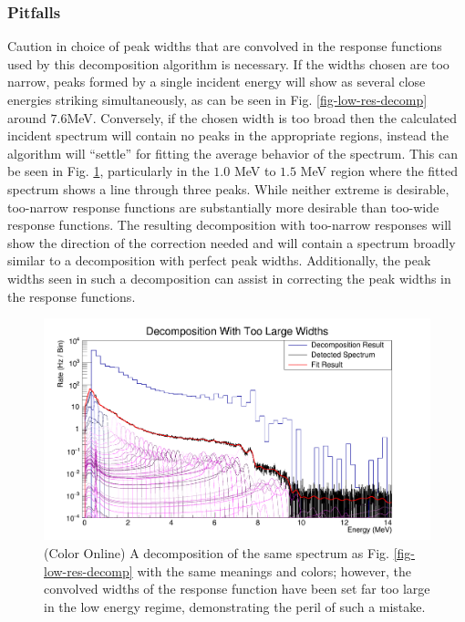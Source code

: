 \documentclass[5p]{elsarticle}
\begin{document}
\subsubsection{Pitfalls}
Caution in choice of peak widths that are convolved in the response functions used by this decomposition algorithm is necessary. If the widths chosen are too narrow, peaks formed by a single incident energy will show as several close energies striking simultaneously, as can be seen in Fig. \ref{fig-low-res-decomp} around $7.6$MeV. Conversely, if the chosen width is too broad then the calculated incident spectrum will contain no peaks in the appropriate regions, instead the algorithm will ``settle'' for fitting the average behavior of the spectrum. This can be seen in Fig. \ref{fig-low-res-bad-decomp}, particularly in the $1.0$ MeV to $1.5$ MeV region where the fitted spectrum shows a line through three peaks. While neither extreme is desirable, too-narrow response functions are substantially more desirable than too-wide response functions. The resulting decomposition with too-narrow responses will show the direction of the correction needed and will contain a spectrum broadly similar to a decomposition with perfect peak widths. Additionally, the peak widths seen in such a decomposition can assist in correcting the peak widths in the response functions.

\begin{figure}[t]
\begin{center}
\includegraphics[width=\linewidth]{fit_plot_bad}
\caption{(Color Online) A decomposition of the same spectrum as Fig. \ref{fig-low-res-decomp} with the same meanings and colors; however, the convolved widths of the response function have been set far too large in the low energy regime, demonstrating the peril of such a mistake.}
\label{fig-low-res-bad-decomp}
\end{center}
\end{figure}
\end{document}
